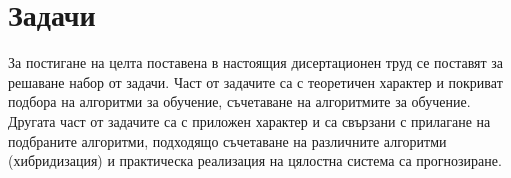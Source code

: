 \section*{Задачи}

За постигане на целта поставена в настоящия дисертационен труд се поставят за решаване набор от задачи. Част от задачите са с теоретичен характер и покриват подбора на алгоритми за обучение, съчетаване на алгоритмите за обучение. Другата част от задачите са с приложен характер и са свързани с прилагане на подбраните алгоритми, подходящо съчетаване на различните алгоритми (хибридизация) и практическа реализация на цялостна система са прогнозиране. 


